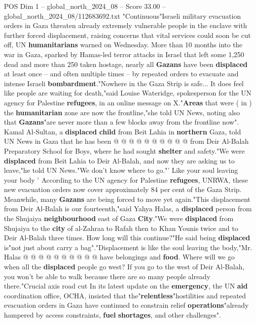 \begin{textsample}{POS Dim 1 – global\_north\_2024\_08 – Score 33.00 – global\_north\_2024\_08/112683692.txt}  \label{ex:f1_pos_403}
"Continuous"Israeli military evacuation orders in Gaza threaten already extremely vulnerable people in the enclave with further forced displacement, raising concerns that vital services could soon be cut off, UN \textbf{humanitarians} warned on Wednesday.
More than 10 months into the war in Gaza, sparked by Hamas-led terror attacks in Israel that left some 1,250 dead and more than 250 taken hostage, nearly all \textbf{Gazans} have been \textbf{displaced} at least once -- and often multiple times -- by repeated orders to evacuate and intense Israeli \textbf{bombardment}."Nowhere in the Gaza Strip is safe...
It does feel like people are waiting for death,"said Louise Wateridge, spokesperson for the UN agency for Palestine \textbf{refugees}, in an online message on X."\textbf{Areas} that were ( in ) the \textbf{humanitarian} zone are now the frontline,"she told UN News, noting also that \textbf{Gazans}"are never more than a few blocks away from the frontline now".
Kamal Al-Sultan, a \textbf{displaced} \textbf{child} from Beit Lahia in \textbf{northern} Gaza, told UN News in Gaza that he has been @ @ @ @ @ @ @ @ @ @ from Deir Al-Balah Preparatory School for Boys, where he had sought \textbf{shelter} and safety."We were \textbf{displaced} from Beit Lahia to Deir Al-Balah, and now they are asking us to leave,"he told UN News."We don't know where to go."' Like your soul leaving your body ' According to the UN agency for Palestine \textbf{refugees}, UNRWA, these new evacuation orders now cover approximately 84 per cent of the Gaza Strip.
Meanwhile, many \textbf{Gazans} are being forced to move yet again."This displacement from Deir Al-Balah is our fourteenth,"said Yahya Halas, a \textbf{displaced} person from the Shujaiya \textbf{neighbourhood} east of Gaza \textbf{City}."We were \textbf{displaced} from Shujaiya to the \textbf{city} of al-Zahraa to Rafah then to Khan Younis twice and to Deir Al-Balah three times.
How long will this continue?"He said being \textbf{displaced} is"not just about carry a bag"."Displacement is like the soul leaving the body,"Mr.
Halas @ @ @ @ @ @ @ @ @ @ have belongings and \textbf{food}.
Where will we go when all the \textbf{displaced} people go west?
If you go to the west of Deir Al-Balah, you won't be able to walk because there are so many people already there."Crucial axis road cut In its latest update on the \textbf{emergency}, the UN \textbf{aid} coordination office, OCHA, insisted that the"\textbf{relentless}"hostilities and repeated evacuation orders in Gaza have continued to constrain relief \textbf{operations}"already hampered by access constraints, \textbf{fuel} \textbf{shortages}, and other challenges".

\end{textsample}
